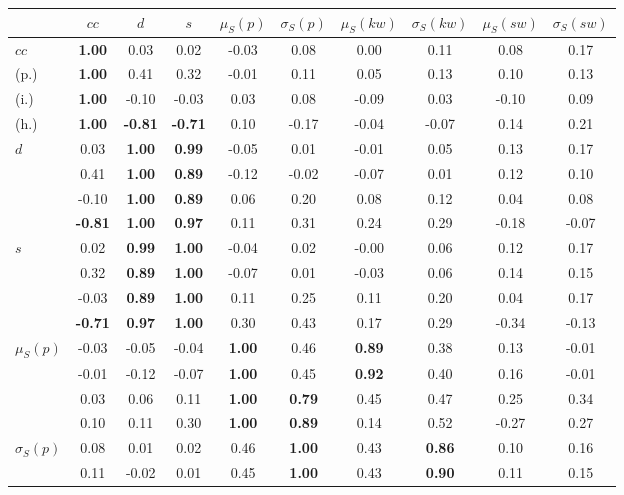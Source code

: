 \begin{table*}[h!]
\begin{center}
\begin{tabular}{| l || c | c | c | c | c | c | c | c | c |}\hline
 & $cc$ & $d$ & $s$ & $\mu_S(p)$ & $\sigma_S(p)$ & $\mu_S(kw)$ & $\sigma_S(kw)$ & $\mu_S(sw)$ & $\sigma_S(sw)$ \\\hline\hline
$cc$ & {\bf 1.00} & 0.03 & 0.02 & -0.03 & 0.08 & 0.00 & 0.11 & 0.08 & 0.17 \\
(p.) & {\bf 1.00} & 0.41 & 0.32 & -0.01 & 0.11 & 0.05 & 0.13 & 0.10 & 0.13 \\
(i.) & {\bf 1.00} & -0.10 & -0.03 & 0.03 & 0.08 & -0.09 & 0.03 & -0.10 & 0.09 \\
(h.) & {\bf 1.00} & {\bf -0.81} & {\bf -0.71} & 0.10 & -0.17 & -0.04 & -0.07 & 0.14 & 0.21 \\\hline
$d$ & 0.03 & {\bf 1.00} & {\bf 0.99} & -0.05 & 0.01 & -0.01 & 0.05 & 0.13 & 0.17 \\
 & 0.41 & {\bf 1.00} & {\bf 0.89} & -0.12 & -0.02 & -0.07 & 0.01 & 0.12 & 0.10 \\
 & -0.10 & {\bf 1.00} & {\bf 0.89} & 0.06 & 0.20 & 0.08 & 0.12 & 0.04 & 0.08 \\
 & {\bf -0.81} & {\bf 1.00} & {\bf 0.97} & 0.11 & 0.31 & 0.24 & 0.29 & -0.18 & -0.07 \\\hline
$s$ & 0.02 & {\bf 0.99} & {\bf 1.00} & -0.04 & 0.02 & -0.00 & 0.06 & 0.12 & 0.17 \\
 & 0.32 & {\bf 0.89} & {\bf 1.00} & -0.07 & 0.01 & -0.03 & 0.06 & 0.14 & 0.15 \\
 & -0.03 & {\bf 0.89} & {\bf 1.00} & 0.11 & 0.25 & 0.11 & 0.20 & 0.04 & 0.17 \\
 & {\bf -0.71} & {\bf 0.97} & {\bf 1.00} & 0.30 & 0.43 & 0.17 & 0.29 & -0.34 & -0.13 \\\hline
$\mu_S(p)$ & -0.03 & -0.05 & -0.04 & {\bf 1.00} & 0.46 & {\bf 0.89} & 0.38 & 0.13 & -0.01 \\
 & -0.01 & -0.12 & -0.07 & {\bf 1.00} & 0.45 & {\bf 0.92} & 0.40 & 0.16 & -0.01 \\
 & 0.03 & 0.06 & 0.11 & {\bf 1.00} & {\bf 0.79} & 0.45 & 0.47 & 0.25 & 0.34 \\
 & 0.10 & 0.11 & 0.30 & {\bf 1.00} & {\bf 0.89} & 0.14 & 0.52 & -0.27 & 0.27 \\\hline
$\sigma_S(p)$ & 0.08 & 0.01 & 0.02 & 0.46 & {\bf 1.00} & 0.43 & {\bf 0.86} & 0.10 & 0.16 \\
 & 0.11 & -0.02 & 0.01 & 0.45 & {\bf 1.00} & 0.43 & {\bf 0.90} & 0.11 & 0.15 \\

\end{tabular}
\end{center}
\end{table*}

